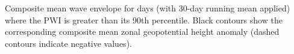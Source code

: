 \label{fig:envelope_climatology}
Composite mean wave envelope for days (with 30-day running mean applied) where the PWI is greater than its 90th percentile. Black contours show the corresponding composite mean zonal geopotential height anomaly (dashed contours indicate negative values).  